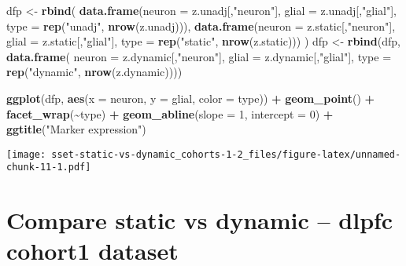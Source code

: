 \documentclass[
]{article}
\newenvironment{Shaded}{\begin{snugshade}}{\end{snugshade}}
\newcommand{\AttributeTok}[1]{\textcolor[rgb]{0.13,0.29,0.53}{#1}}
\newcommand{\DecValTok}[1]{\textcolor[rgb]{0.00,0.00,0.81}{#1}}
\newcommand{\FunctionTok}[1]{\textcolor[rgb]{0.13,0.29,0.53}{\textbf{#1}}}
\newcommand{\NormalTok}[1]{#1}
\newcommand{\OtherTok}[1]{\textcolor[rgb]{0.56,0.35,0.01}{#1}}
\newcommand{\SpecialCharTok}[1]{\textcolor[rgb]{0.81,0.36,0.00}{\textbf{#1}}}
\newcommand{\StringTok}[1]{\textcolor[rgb]{0.31,0.60,0.02}{#1}}
\begin{document}
\begin{Shaded}
\begin{Highlighting}[]
\NormalTok{dfp }\OtherTok{\textless{}{-}} \FunctionTok{rbind}\NormalTok{(}
  \FunctionTok{data.frame}\NormalTok{(}\AttributeTok{neuron =}\NormalTok{ z.unadj[,}\StringTok{"neuron"}\NormalTok{], }\AttributeTok{glial =}\NormalTok{ z.unadj[,}\StringTok{"glial"}\NormalTok{], }\AttributeTok{type =} \FunctionTok{rep}\NormalTok{(}\StringTok{"unadj"}\NormalTok{, }\FunctionTok{nrow}\NormalTok{(z.unadj))),}
  \FunctionTok{data.frame}\NormalTok{(}\AttributeTok{neuron =}\NormalTok{ z.static[,}\StringTok{"neuron"}\NormalTok{], }\AttributeTok{glial =}\NormalTok{ z.static[,}\StringTok{"glial"}\NormalTok{], }\AttributeTok{type =} \FunctionTok{rep}\NormalTok{(}\StringTok{"static"}\NormalTok{, }\FunctionTok{nrow}\NormalTok{(z.static)))}
\NormalTok{)}
\NormalTok{dfp }\OtherTok{\textless{}{-}} \FunctionTok{rbind}\NormalTok{(dfp,}
             \FunctionTok{data.frame}\NormalTok{(}
               \AttributeTok{neuron =}\NormalTok{ z.dynamic[,}\StringTok{"neuron"}\NormalTok{], }\AttributeTok{glial =}\NormalTok{ z.dynamic[,}\StringTok{"glial"}\NormalTok{], }
               \AttributeTok{type =} \FunctionTok{rep}\NormalTok{(}\StringTok{"dynamic"}\NormalTok{, }\FunctionTok{nrow}\NormalTok{(z.dynamic))))}

\FunctionTok{ggplot}\NormalTok{(dfp, }\FunctionTok{aes}\NormalTok{(}\AttributeTok{x =}\NormalTok{ neuron, }\AttributeTok{y =}\NormalTok{ glial, }\AttributeTok{color =}\NormalTok{ type)) }\SpecialCharTok{+} 
  \FunctionTok{geom\_point}\NormalTok{() }\SpecialCharTok{+} \FunctionTok{facet\_wrap}\NormalTok{(}\SpecialCharTok{\textasciitilde{}}\NormalTok{type) }\SpecialCharTok{+}
  \FunctionTok{geom\_abline}\NormalTok{(}\AttributeTok{slope =} \DecValTok{1}\NormalTok{, }\AttributeTok{intercept =} \DecValTok{0}\NormalTok{) }\SpecialCharTok{+}
  \FunctionTok{ggtitle}\NormalTok{(}\StringTok{"Marker expression"}\NormalTok{)}
\end{Highlighting}
\end{Shaded}

\texttt{[image: sset-static-vs-dynamic\_cohorts-1-2\_files/figure-latex/unnamed-chunk-11-1.pdf]}

\hypertarget{compare-static-vs-dynamic-dlpfc-cohort1-dataset}{%
\section{Compare static vs dynamic -- dlpfc cohort1
dataset}\label{compare-static-vs-dynamic-dlpfc-cohort1-dataset}}
\end{document}
